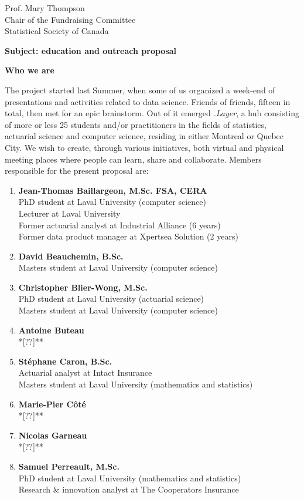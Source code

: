 \documentclass[11pt, a4paper]{letter} %
\begin{document}
\begin{letter}{
	Prof. Mary Thompson\\
	Chair of the Fundraising Committee\\
	Statistical Society of Canada
	
	\bigskip
	\textbf{Subject: education and outreach proposal}%
}
\bigskip
\noindent \textbf{Who we are}

The project started last Summer, when some of us organized a week-end of presentations and activities related to data science. Friends of friends, fifteen in total, then met for an epic brainstorm. %
Out of it emerged \emph{.Layer}, a hub consisting of more or less 25 students and/or practitioners in the fields of statistics, actuarial science and computer science, residing in either Montreal or Quebec City. We wish to create, through various initiatives, both virtual and physical meeting places where people can learn, share and collaborate. Members responsible for the present proposal are:
\begin{enumerate}
	\item[] \textbf{Jean-Thomas Baillargeon, M.Sc. FSA, CERA}\\
	\quad PhD student at Laval University (computer science)\\
	\quad Lecturer at Laval University\\
	\quad Former actuarial analyst at Industrial Alliance (6 years)\\
	\quad Former data product manager at Xpertsea Solution (2 years)\\
	\item[] \textbf{David Beauchemin, B.Sc.}\\
	\quad Masters student at Laval University (computer science)
	\item[] \textbf{Christopher Blier-Wong, M.Sc.}\\
	\quad PhD student at Laval University (actuarial science)\\
	\quad Masters student at Laval University (computer science)
	\item[] \textbf{Antoine Buteau}\\
	\quad **[??]**
	\item[] \textbf{Stéphane Caron, B.Sc.}\\
	\quad Actuarial analyst at Intact Insurance\\
	\quad Masters student at Laval University (mathematics and statistics)
	\item[] \textbf{Marie-Pier Côté}\\
	\quad **[??]**
	\item[] \textbf{Nicolas Garneau}\\
	\quad **[??]**
	\item[] \textbf{Samuel Perreault, M.Sc.}\\
	\quad PhD student at Laval University (mathematics and statistics)\\
	\quad Research \& innovation analyst at The Cooperators Insurance
\end{enumerate}


\end{letter}
\end{document}
